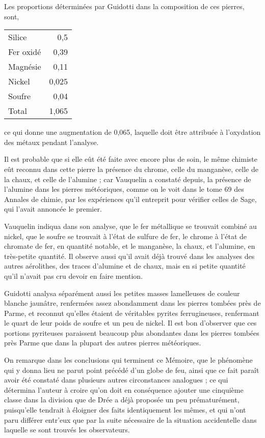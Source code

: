 \documentclass[a4paper, 12pt, oneside, french]{article}
\begin{document}
Les proportions déterminées par Guidotti dans la composition de ces pierres, sont,
\begin{table}[H]
    \centering
    \begin{tabular}{l r}
        Silice & 0,5 \\ 
        Fer oxidé & 0,39 \\
        Magnésie & 0,11 \\
        Nickel & 0,025 \\
        Soufre & 0,04 \\ \hline
        Total & 1,065 \\
    \end{tabular}
\end{table}
ce qui donne une augmentation de 0,065, laquelle doit être attribuée à l'oxydation des métaux pendant l'analyse.

Il est probable que si elle eût été faite avec encore plus de soin, le même chimiste eût reconnu dans cette pierre la présence du chrome, celle du manganèse, celle de la chaux, et celle de l'alumine ; car Vauquelin a constaté depuis, la présence de l'alumine dans les pierres météoriques, comme on le voit dans le tome 69 des Annales de chimie, par les expériences qu'il entreprit pour vérifier celles de Sage, qui l'avait annoncée le premier.

Vauquelin indiqua dans son analyse, que le fer métallique se trouvait combiné au nickel, que le soufre se trouvait à l'état de sulfure de fer, le chrome à l'état de chromate de fer, en quantité notable, et le manganèse, la chaux, et l'alumine, en très-petite quantité. Il observe aussi qu'il avait déjà trouvé dans les analyses des autres aérolithes, des traces d'alumine et de chaux, mais en si petite quantité qu'il n'avait pas cru devoir en faire mention.

Guidotti analysa séparément aussi les petites masses lamelleuses de couleur blanche jaunâtre, renfermées assez abondamment dans les pierres tombées près de Parme, et reconnut qu'elles étaient de véritables pyrites ferrugineuses, renfermant le quart de leur poids de soufre et un peu de nickel. Il est bon d'observer que ces portions pyriteuses paraissent beaucoup plus abondantes dans les pierres tombées près Parme que dans la plupart des autres pierres météoriques.

On remarque dans les conclusions qui terminent ce Mémoire, que le phénomène qui y donna lieu ne parut point précédé d'un globe de feu, ainsi que ce fait paraît avoir été constaté dans plusieurs autres circonstances analogues ; ce qui détermina l'auteur à croire qu'on doit en conséquence ajouter une cinquième classe dans la division que de Drée a déjà proposée un peu prématurément, puisqu'elle tendrait à éloigner des faits identiquement les mêmes, et qui n'ont paru différer entr'eux que par la suite nécessaire de la situation accidentelle dans laquelle se sont trouvés les observateurs.
\end{document}
